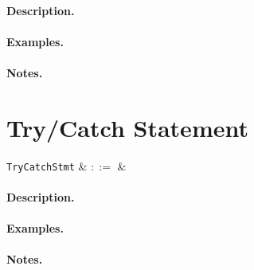 \paragraph{Description.}

\paragraph{Examples.}

\paragraph{Notes.} 


\section{Try/Catch Statement}

\begin{syntax}
  \verb+TryCatchStmt+ & $::=$ &\\
\end{syntax}

\paragraph{Description.}

\paragraph{Examples.}

\paragraph{Notes.} 
